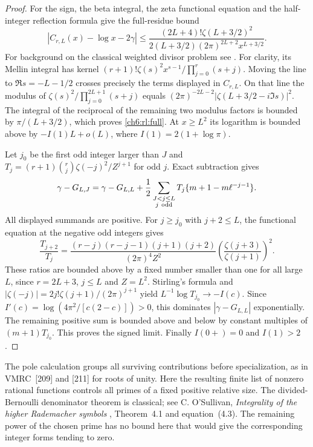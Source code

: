 \documentclass[11pt,a4paper,oneside,openany]{report}
\theoremstyle{remark}\newtheorem{remark}[theorem]{Remark}
\numberwithin{equation}{section}
\begin{document}
\begin{proof}
For the sign, the beta integral, the zeta functional equation and
the half-integer reflection formula give the full-residue bound
\begin{equation}\label{ch6:rl:full}
 |C_{r,L}(x)-\log x-2\gamma|\le
 \frac{(2L+4)!\zeta(L+3/2)^2}
 {2(L+3/2)(2\pi)^{2L+2} x^{L+3/2}} .
\end{equation}
For background on the classical weighted divisor problem see \cite{bkz}. For clarity, its Mellin integral has kernel
$(r+1)!\zeta(s)^2x^{s-1}/\prod_{j=0}^{r}(s+j)$. Moving the line
to $\Re s=-L-1/2$ crosses precisely the terms displayed in
$C_{r,L}$. On that line the modulus of
$\zeta(s)^2/\prod_{j=0}^{2L+1}(s+j)$ equals
$(2\pi)^{-2L-2}|\zeta(L+3/2-i\Im s)|^2$.
The integral of the reciprocal of the remaining two modulus factors
is bounded by $\pi/(L+3/2)$, which proves \eqref{ch6:rl:full}.
At $x\ge L^2$ its logarithm is bounded above by
$-I(1)L+o(L)$, where $I(1)=2(1+\log\pi)$.

Let $j_0$ be the first odd integer larger than $J$ and
$T_j=(r+1)\binom rj\zeta(-j)^2/Z^{j+1}$ for odd $j$.
Exact subtraction gives
\[
 \gamma-G_{L,J}=\gamma-G_{L,L}
   +\frac12\sum_{\substack{J<j\le L\\j\ {\rm odd}}}
      T_j\{m+1-m\ell^{-j-1}\}.
\]
All displayed summands are positive. For $j\ge j_0$ with $j+2\le L$,
the functional equation at the negative odd integers gives
\[
 \frac{T_{j+2}}{T_j}=
 \frac{(r-j)(r-j-1)(j+1)(j+2)}{(2\pi)^4Z^2}
 \left(\frac{\zeta(j+3)}{\zeta(j+1)}\right)^2 .
\]
These ratios are bounded above by a fixed number smaller than one
for all large $L$, since $r=2L+3$, $j\le L$ and $Z=L^2$.
Stirling's formula and
$|\zeta(-j)|=2j!\zeta(j+1)/(2\pi)^{j+1}$ yield
$L^{-1}\log T_{j_0}\to-I(c)$.
Since $I'(c)=\log(4\pi^2/[c(2-c)])>0$, this dominates
$|\gamma-G_{L,L}|$ exponentially. The remaining positive sum is
bounded above and below by constant multiples of $(m+1)T_{j_0}$.
This proves the signed limit. Finally $I(0+)=0$ and $I(1)>2$.
\end{proof}

The pole calculation groups all surviving contributions before
specialization, as in VMRC~[209] and [211] for roots of unity.
Here the resulting finite list of nonzero rational functions controls
all primes of a fixed positive relative size. The divided-Bernoulli
denominator theorem is classical; see C. O'Sullivan,
\emph{Integrality of the higher Rademacher symbols} \cite{os},
Theorem~4.1 and equation~(4.3). The remaining power of the
chosen prime has no bound here that would give the corresponding
integer forms tending to zero.
\end{document}
